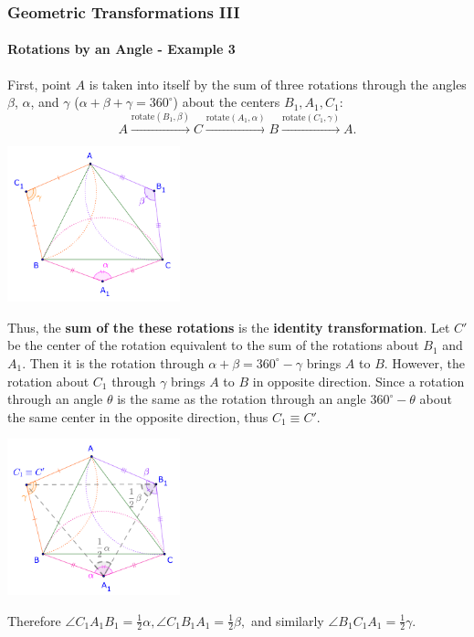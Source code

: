 \documentclass[8pt,xcolor=table,dvipsnames]{beamer}
\providecommand{\half}{\frac{1}{2}}
\newcommand{\dg}{^\circ}
\begin{document}
\begin{frame}[t]
    \frametitle{Geometric Transformations III}
    \framesubtitle{Rotations by an Angle - Example 3}
    \begin{overprint}
        First, point $A$ is taken into itself by the sum of three rotations through the angles $\beta$, $\alpha$, and $\gamma$
        ($\alpha + \beta + \gamma = 360\dg$) about the centers $B_1, A_1, C_1$:
        \[
            A \stackrel{\text{rotate}(B_1, \beta)}{\rightarrow} C \stackrel{\text{rotate}(A_1, \alpha)}{\rightarrow} B 
            \stackrel{\text{rotate}(C_1, \gamma)}{\rightarrow} A. 
        \]
        \begin{center}
            \includegraphics[width=5cm]{./svg/pdf/rotation-6b.pdf}
        \end{center}
        Thus, the \textbf{sum of the these rotations} is the \textbf{identity transformation}.
        Let $C'$ be the center of the rotation equivalent to the sum of the rotations about $B_1$ and $A_1$.
        Then it is the rotation through $\alpha + \beta = 360\dg - \gamma$ brings $A$ to $B$.
        \bigbreak
        However, the rotation about $C_1$ through $\gamma$ brings $A$ to $B$ in opposite direction.
        Since a rotation through an angle $\theta$ is the same as the rotation through an angle $360\dg - \theta$
        about the same center in the opposite direction, thus $C_1 \equiv C'.$
        \begin{center}
            \includegraphics[width=5cm]{./svg/pdf/rotation-6c.pdf}
        \end{center}
        Therefore $\angle C_1A_1B_1 = \half \alpha, \angle C_1B_1A_1 = \half \beta,$ and similarly $\angle B_1C_1A_1 = \half \gamma.$ 
    \end{overprint}
\end{frame}
\end{document}
